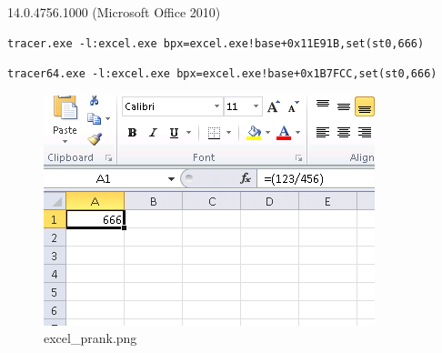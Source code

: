  14.0.4756.1000 (Microsoft Office 2010)

\begin{lstlisting}
tracer.exe -l:excel.exe bpx=excel.exe!base+0x11E91B,set(st0,666)
\end{lstlisting}

\begin{lstlisting}
tracer64.exe -l:excel.exe bpx=excel.exe!base+0x1B7FCC,set(st0,666)
\end{lstlisting}


\begin{figure}[ht!]
\centering
\includegraphics[scale=0.66]{excel_prank.png}
\caption{excel\_prank.png}
\end{figure}

